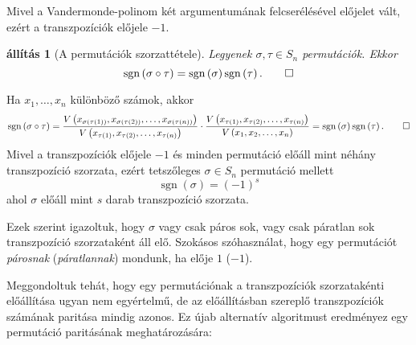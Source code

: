\documentclass[a4paper, showtrims]{memoir}
\makeatletter
\renewenvironment{proof}[1][\proofname]
    {\par\pushQED{\qed}%
    \normalfont \topsep6\p@\@plus6\p@\relax
    \trivlist
    \item[\hskip\labelsep
        \itshape
    #1\@addpunct{:}]\ignorespaces}
    {\popQED\endtrivlist\@endpefalse}
\theoremstyle{plain}
\newtheorem{proposition}{állítás}[chapter]
\theoremstyle{remark}
\theoremstyle{definition}
\DeclareMathOperator{\sgn}{sgn}
\makeatother
\begin{document}
    Mivel a Vandermonde-polinom két argumentumának felcserélésével előjelet vált,
    ezért a transzpozíciók előjele $-1$.
    \begin{proposition}[A permutációk szorzattétele]
        Legyenek $\sigma,\tau\in S_n$ permutációk. 
        Ekkor 
        \[
            \sgn\left( \sigma\circ\tau \right)=\sgn\left( \sigma \right)\sgn\left( \tau \right).\qedhere
        \]
    \end{proposition}
    \begin{proof}
        Ha $x_1,\dots,x_n$ különböző számok, akkor
        \[
            \sgn\left( \sigma\circ\tau \right)
            =
            \frac{V\left( x_{\sigma\left( \tau\left( 1 \right) \right)},
                          x_{\sigma\left( \tau\left( 2 \right) \right)},\ldots,
                          x_{\sigma\left( \tau\left( n \right) \right)}
                    \right)}{%
                  V\left( x_{\tau\left( 1 \right)},
                          x_{\tau\left( 2 \right)},\ldots,
                          x_{\tau\left( n \right)}
                    \right)
                    }
            \cdot
            \frac{
                  V\left( x_{\tau\left( 1 \right)},
                          x_{\tau\left( 2 \right)},\ldots,
                          x_{\tau\left( n \right)}
                    \right)
            }{V\left( x_1,x_2,\dots,x_n \right)}
            =
            \sgn\left( \sigma \right)\sgn\left( \tau \right).\qedhere
        \]
    \end{proof}
    Mivel a transzpozíciók előjele $-1$ és minden permutáció előáll mint néhány transzpozíció szorzata,
    ezért tetszőleges $\sigma\in S_n$ permutáció mellett
    \[
        \sgn\left( \sigma \right)=\left( -1 \right)^s
    \]
    ahol $\sigma$ előáll mint $s$ darab transzpozíció szorzata.

    Ezek szerint igazoltuk, hogy $\sigma$ vagy csak páros sok, vagy csak páratlan sok transzpozíció szorzataként áll elő. Szokásos szóhasználat, hogy egy permutációt \emph{párosnak} (\emph{páratlannak}) mondunk,
    ha elője $1$ ($-1$).

    Meggondoltuk tehát, hogy egy permutációnak
    a transzpozíciók szorzatakénti előállítása ugyan nem egyértelmű,
    de az előállításban szereplő transzpozíciók számának paritása mindig azonos.
    Ez újab  alternatív algoritmust eredményez egy permutáció paritásának meghatározására:
\end{document}
